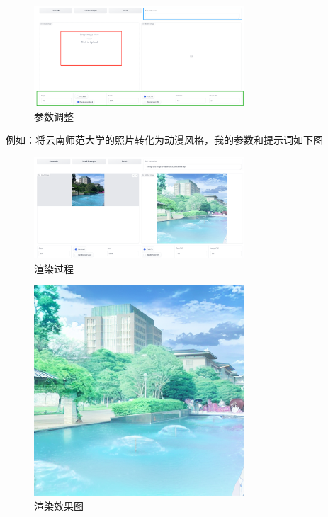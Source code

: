 \centering
\begin{figure}[H] %
    \centering %
    \includegraphics[width=0.7\textwidth]{sections/images/image-20250211145347208.png} %
    \caption{参数调整} %
    \label{Fig.main1} %
\end{figure}%

例如：将云南师范大学的照片转化为动漫风格，我的参数和提示词如下图
\centering
\begin{figure}[H] %
    \centering %
    \includegraphics[width=0.7\textwidth]{sections/images/9c6c2ff0409374eed093b8ec3447507.png} %
    \caption{渲染过程} %
    \label{Fig.main1} %
\end{figure}%

\centering
\begin{figure}[H] %
    \centering %
    \includegraphics[width=0.7\textwidth]{sections/images/change.png} %
    \caption{渲染效果图} %
    \label{Fig.main1} %
\end{figure}%

